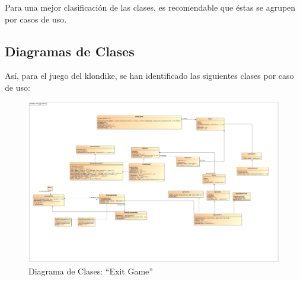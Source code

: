 \documentclass[11pt]{article}
\begin{document}
Para una mejor clasificación de las clases, es recomendable que éstas se agrupen por casos de uso.

\subsection{Diagramas de Clases}

Así, para el juego del klondike, se han identificado las siguientes clases por caso de uso:

\begin{landscape}
\begin{center}
 \begin{figure}[H]
 \begin{center}
 \includegraphics[scale=0.32]{Analysis/ExitGame00.jpg}
   \caption{Diagrama de Clases: ``Exit Game''}
   \label{fig:exitgame}
 \end{center}
 \end{figure}
\end{center}
\end{landscape}
\restoregeometry
\end{document}
